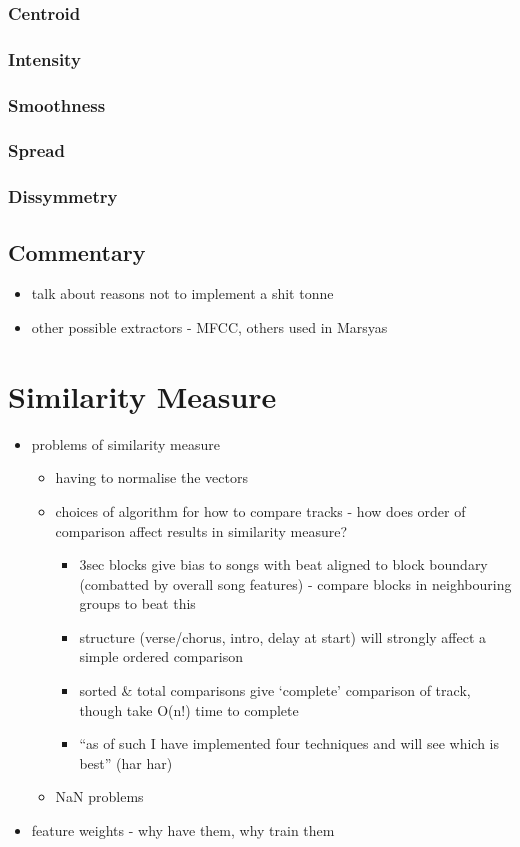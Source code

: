 \subsubsection{Centroid}

\subsubsection{Intensity}

\subsubsection{Smoothness}

\subsubsection{Spread}

\subsubsection{Dissymmetry}

\subsection{Commentary}
\begin{itemize}
	\item talk about reasons not to implement a shit tonne
	\item other possible extractors - MFCC, others used in Marsyas
\end{itemize}
\section{Similarity Measure}
\begin{itemize}
	\item problems of similarity measure
	\begin{itemize}
		\item having to normalise the vectors
		\item choices of algorithm for how to compare tracks - how does order of comparison affect results in similarity measure?
		\begin{itemize}
			\item 3sec blocks give bias to songs with beat aligned to block boundary (combatted by overall song features) - compare blocks in neighbouring groups to beat this
			\item structure (verse/chorus, intro, delay at start) will strongly affect a simple ordered comparison
			\item sorted \& total comparisons give `complete' comparison of track, though take O(n!) time to complete
			\item ``as of such I have implemented four techniques and will see which is best'' (har har)
		\end{itemize}
		\item NaN problems
	\end{itemize}
	\item feature weights - why have them, why train them
\end{itemize}
